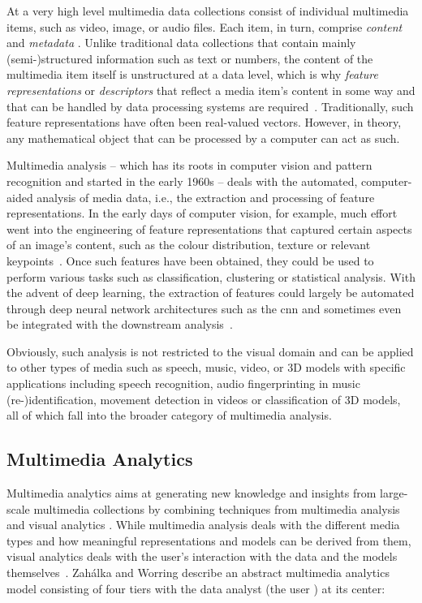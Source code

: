 At a very high level multimedia data collections consist of individual multimedia items, such as video, image, or audio files. Each item, in turn, comprise \emph{content} and \emph{metadata} \cite{Blanken:2007multimedia}. Unlike traditional data collections that contain mainly (semi-)structured information such as text or numbers, the content of the multimedia item itself is unstructured at a data level, which is why \emph{feature representations} or \emph{descriptors} that reflect a media item's content in some way and that can be handled by data processing systems are required~\cite{Blanken:2007multimedia,Zahalka:2014Towards}. Traditionally, such feature representations have often been real-valued vectors. However, in theory, any mathematical object that can be processed by a computer can act as such. 

Multimedia analysis -- which has its roots in computer vision and pattern recognition and started in the early 1960s -- deals with the automated, computer-aided analysis of media data, i.e., the extraction and processing of feature representations. In the early days of computer vision, for example, much effort went into the engineering of feature representations that captured certain aspects of an image's content, such as the colour distribution, texture or relevant keypoints~\cite{Lowe:1999object,Bay:2006surf}. Once such features have been obtained, they could be used to perform various tasks such as classification, clustering or statistical analysis. With the advent of deep learning, the extraction of features could largely be automated through deep neural network architectures such as the \acrfull{cnn} and sometimes even be integrated with the downstream analysis~\cite{Goodfellow:2016deep}. 

Obviously, such analysis is not restricted to the visual domain and can be applied to other types of media such as speech, music, video, or 3D models with specific applications including speech recognition, audio fingerprinting in music (re-)identification, movement detection in videos or classification of 3D models, all of which fall into the broader category of multimedia analysis.

\subsection{Multimedia Analytics}

Multimedia analytics aims at generating new knowledge and insights from large-scale multimedia collections by combining techniques from multimedia analysis and visual analytics \cite{Zahalka:2014Towards,Seebacher:2017Visual}. While multimedia analysis deals with the different media types and how meaningful representations and models can be derived from them, visual analytics deals with the user's interaction with the data and the models themselves~\cite{Chinchor:2010Multimedia,Keim:2010mastering}. 
Zahálka and Worring \cite{Zahalka:2014Towards} describe an abstract multimedia analytics model consisting of four tiers with the data analyst (the user \cite{Seebacher:2017Visual}) at its center:

